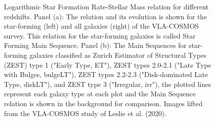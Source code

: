 \begin{figure}[htbp]
    \centering
    \caption{Logarithmic Star Formation Rate-Stellar Mass relation for different redshifts. Panel (a): The relation and its evolution is shown for the star-forming (left) and all galaxies (right) of the VLA-COSMOS survey. This relation for the star-forming galaxies is called Star Forming Main Sequence. Panel (b):  The Main Sequences for star-forming galaxies classified as Zurich Estimator of Structural Types\cite{ZEST2007} (ZEST) type 1 ("Early Type, ET"), ZEST types 2.0-2.1 ("Late Type with Bulges, bulgeLT"), ZEST types 2.2-2.3 ("Disk-dominated Late Type, diskLT"), and ZEST type 3 ("Irregular, irr"), the plotted lines represent each galaxy type at each plot and the Main Sequence relation is shown in the background for comparison.  Images lifted from the VLA-COSMOS study of Leslie et al. (2020)\cite{Leslie2020}. }
    \label{fig:SFR-StMass}
\end{figure}

